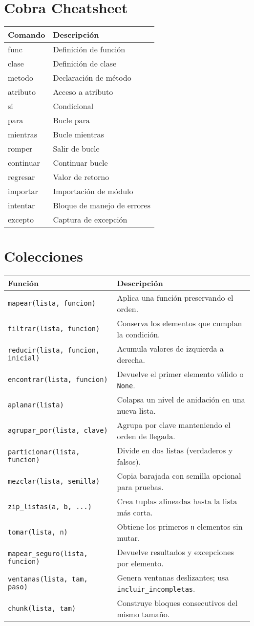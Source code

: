 \documentclass{article}
\begin{document}
\section*{Cobra Cheatsheet}
\begin{tabular}{ll}
\textbf{Comando} & \textbf{Descripción}\\\hline
func & Definición de función\\
clase & Definición de clase\\
metodo & Declaración de método\\
atributo & Acceso a atributo\\
si & Condicional\\
para & Bucle para\\
mientras & Bucle mientras\\
romper & Salir de bucle\\
continuar & Continuar bucle\\
regresar & Valor de retorno\\
importar & Importación de módulo\\
intentar & Bloque de manejo de errores\\
excepto & Captura de excepción\\
\end{tabular}

\section*{Colecciones}
\begin{tabular}{ll}
\textbf{Función} & \textbf{Descripción}\\\hline
\texttt{mapear(lista, funcion)} & Aplica una función preservando el orden.\\
\texttt{filtrar(lista, funcion)} & Conserva los elementos que cumplan la condición.\\
\texttt{reducir(lista, funcion, inicial)} & Acumula valores de izquierda a derecha.\\
\texttt{encontrar(lista, funcion)} & Devuelve el primer elemento válido o \texttt{None}.\\
\texttt{aplanar(lista)} & Colapsa un nivel de anidación en una nueva lista.\\
\texttt{agrupar\_por(lista, clave)} & Agrupa por clave manteniendo el orden de llegada.\\
\texttt{particionar(lista, funcion)} & Divide en dos listas (verdaderos y falsos).\\
\texttt{mezclar(lista, semilla)} & Copia barajada con semilla opcional para pruebas.\\
\texttt{zip\_listas(a, b, ...)} & Crea tuplas alineadas hasta la lista más corta.\\
\texttt{tomar(lista, n)} & Obtiene los primeros \texttt{n} elementos sin mutar.\\
\texttt{mapear\_seguro(lista, funcion)} & Devuelve resultados y excepciones por elemento.\\
\texttt{ventanas(lista, tam, paso)} & Genera ventanas deslizantes; usa \texttt{incluir\_incompletas}.\\
\texttt{chunk(lista, tam)} & Construye bloques consecutivos del mismo tamaño.\\
\end{tabular}
\end{document}
